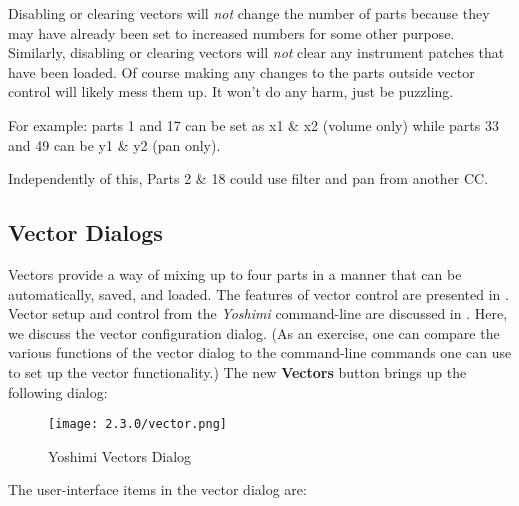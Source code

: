    Disabling or clearing vectors will \textsl{not} change the number of parts
   because they may have already been set to increased numbers for some other
   purpose.  Similarly, disabling or clearing vectors will \textsl{not} clear
   any instrument patches that have been loaded.
   Of course making any changes to the parts outside vector control will likely
   mess them up. It won't do any harm, just be puzzling.

   For example:
   parts 1 and 17 can be set as x1 \& x2 (volume only) while parts 33 and 49
   can be y1 \& y2 (pan only).

   Independently of this, Parts 2 \& 18 could use filter and pan from another
   CC.

\subsection{Vector Dialogs}
\label{subsec:vector_dialogs}

   Vectors provide a way of mixing up to four parts in a manner that can be
   automatically, saved, and loaded.  The features of vector control are presented
   in .
   Vector setup and control from the \textsl{Yoshimi} command-line are
   discussed in
   .
   Here, we discuss the vector configuration dialog.
   (As an exercise, one can compare the various functions of the vector dialog
   to the command-line commands one can use to set up the vector
   functionality.)
   The new \textbf{Vectors} button brings up the following dialog:

\begin{figure}[H]
   \centering
   \texttt{[image: 2.3.0/vector.png]}
   \caption{Yoshimi Vectors Dialog}
   \label{fig:yoshimi_vectors_dialog}
\end{figure}

   The user-interface items in the vector dialog are:

